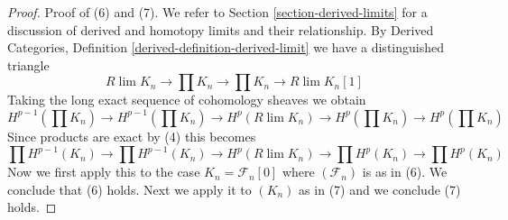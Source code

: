 \documentclass[10pt,a4paper]{amsart}
\theoremstyle{plain}
\theoremstyle{definition}
\theoremstyle{remark}
\numberwithin{equation}{subsection}
\def\lim{\mathop{\mathrm{lim}}\nolimits}
\begin{document}
\begin{proof}
\medskip\noindent
Proof of (6) and (7). We refer to Section \ref{section-derived-limits}
for a discussion of derived and homotopy limits and their relationship.
By Derived Categories, Definition \ref{derived-definition-derived-limit}
we have a distinguished
triangle
$$
R\lim K_n \to \prod K_n \to \prod K_n \to R\lim K_n[1]
$$
Taking the long exact sequence of cohomology sheaves we obtain
$$
H^{p - 1}(\prod K_n) \to H^{p - 1}(\prod K_n) \to
H^p(R\lim K_n) \to H^p(\prod K_n) \to H^p(\prod K_n)
$$
Since products are exact by (4) this becomes
$$
\prod H^{p - 1}(K_n) \to \prod H^{p - 1}(K_n) \to
H^p(R\lim K_n) \to \prod H^p(K_n) \to \prod H^p(K_n)
$$
Now we first apply this to the case $K_n = \mathcal{F}_n[0]$
where $(\mathcal{F}_n)$ is as in (6). We conclude that (6) holds.
Next we apply it to $(K_n)$ as in (7) and we conclude (7) holds.
\end{proof}
\end{document}

